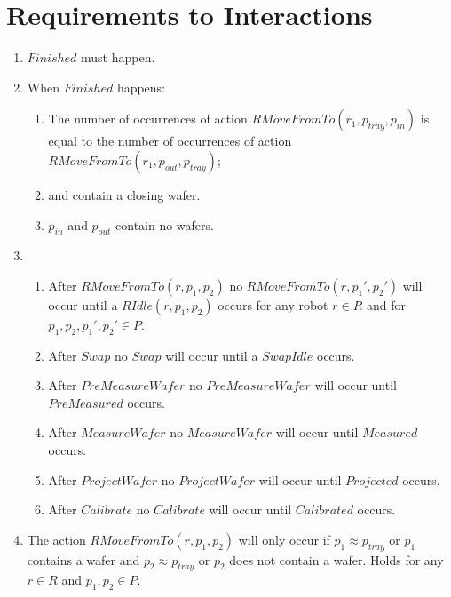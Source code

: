 \section{Requirements to Interactions}\label{sec:req2int}

\begin{enumerate}
    \item $\mathit{Finished}$ must happen.

    \item When $\mathit{Finished}$ happens:
    \begin{enumerate}
        \item The number of occurrences of action $\mathit{RMoveFromTo}(r_1, p_\mathit{tray}, p_\mathit{in})$ is equal to the number of occurrences of action $\mathit{RMoveFromTo}(r_1, p_\mathit{out}, p_\mathit{tray})$;
        \item \chuckMeas and \chuckProj contain a closing wafer.
        \item $p_\mathit{in}$ and $p_\mathit{out}$ contain no wafers.
    \end{enumerate}

    \item \begin{enumerate}
        \item After $\mathit{RMoveFromTo}(r, p_1, p_2)$ no $\mathit{RMoveFromTo}(r, p_1', p_2')$ will occur until a $\mathit{RIdle}(r, p_1,p_2)$ occurs for any robot $r \in R$ and for $p_1, p_2, p_1',p_2' \in P$.
        \item After $\mathit{Swap}$ no $\mathit{Swap}$ will occur until a $\mathit{SwapIdle}$ occurs.
        \item After $\mathit{PreMeasureWafer}$ no $\mathit{PreMeasureWafer}$ will occur until $\mathit{PreMeasured}$ occurs.
        \item After $\mathit{MeasureWafer}$ no $\mathit{MeasureWafer}$ will occur until $\mathit{Measured}$ occurs.
        \item After $\mathit{ProjectWafer}$ no $\mathit{ProjectWafer}$ will occur until $\mathit{Projected}$ occurs.
        \item After $\mathit{Calibrate}$ no $\mathit{Calibrate}$ will occur until $\mathit{Calibrated}$ occurs.
    \end{enumerate}

    \item The action $RMoveFromTo(r, p_1, p_2)$ will only occur if $p_1 \approx p_\mathit{tray}$ or $p_1$ contains a wafer and $p_2 \approx p_\mathit{tray}$ or $p_2$ does not contain a wafer.
    Holds for any $r \in R$ and $p_1,p_2 \in P$.


\end{enumerate}
